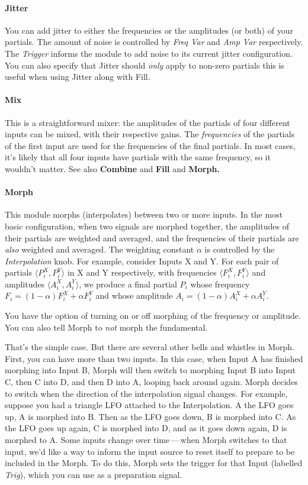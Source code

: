 \documentclass{article}
\begin{document}
\paragraph{Jitter} You can add jitter to either the frequencies or the amplitudes (or both) of your partials.  The amount of noise is controlled by {\it Freq Var} and {\it Amp Var} respectively.  The {\it Trigger} informs the module to add noise to its current jitter configuration.  You can also specify that Jitter should {\it only} apply to non-zero partials this is useful when using Jitter along with Fill.

\paragraph{Mix} This is a straightforward mixer: the amplitudes of the partials of four different inputs can be mixed, with their respective gains.  The {\it frequencies} of the partials of the first input are used for the frequencies of the final partials.  In most cases, it's likely that all four inputs have partials with the same frequency, so it wouldn't matter.  See also {\bf Combine} and {\bf Fill} and {\bf Morph.}

\paragraph{Morph} This module morphs (interpolates) between two or more inputs.  In the most basic configuration, when two signals are morphed together, the amplitudes of their partials are weighted and averaged, and the frequencies of their partials are {\it also} weighted and averaged.  The weighting constant \(\alpha\) is controlled by the {\it Interpolation} knob.  For example, consider Inputs X and Y.  For each pair of partials \(\langle P^X_i, P^Y_i\rangle\) in X and Y respectively, with frequencies \(\langle F^X_i, F^Y_i\rangle\) and amplitudes \(\langle A^X_i, A^Y_i\rangle\), we produce a final partial \(P_i\) whose frequency \(F_i = (1-\alpha) F^X_i + \alpha F^Y_i\) and whose amplitude \(A_i = (1-\alpha) A^X_i + \alpha A^Y_i\).

You have the option of turning on or off morphing of the frequency or amplitude.  You can also tell Morph to {\it not} morph the fundamental.  

That's the simple case.  But there are several other bells and whistles in Morph.  First, you can have more than two inputs.  In this case, when Input A has finished morphing into Input B, Morph will then switch to morphing Input B into Input C, then C into D, and then D into A, looping back around again.  Morph decides to switch when the direction of the interpolation signal changes.  For example, suppose you had a triangle LFO attached to the Interpolation.  A the LFO goes up, A is morphed into B.  Then as the LFO goes down, B is morphed into C.  As the LFO goes up again, C is morphed into D, and as it goes down again, D is morphed to A.  Some inputs change over time\,---\,when Morph switches to that input, we'd like a way to inform the input source to reset itself to prepare to be included in the Morph.  To do this, Morph sets the trigger for that Input (labelled {\it Trig}), which you can use as a preparation signal.
\end{document}
